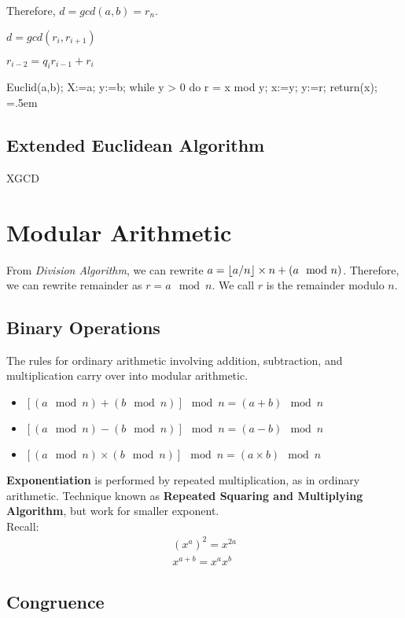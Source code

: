 \documentclass[a4paper]{article}
\DeclarePairedDelimiter\floor{\lfloor}{\rfloor}
\newenvironment{lcverbatim}
 {\SaveVerbatim{cverb}}
 {\endSaveVerbatim
  \flushleft\fboxrule=0pt\fboxsep=.5em
  \colorbox{cverbbg}{%
    \makebox[\dimexpr\linewidth-2\fboxsep][l]{\BUseVerbatim{cverb}}%
  }
  \endflushleft
}
\begin{document}
Therefore, $d = gcd(a, b) = r_n$.

$d = gcd(r_{i}, r_{i+1})$

$r_{i-2} = q_{i} r_{i-1} + r_{i}$

\begin{lcverbatim}
Euclid(a,b);
X:=a; y:=b;
while y > 0 do {
  r = x mod y;
  x:=y;
  y:=r; }
return(x);
\end{lcverbatim}

\subsection{Extended Euclidean Algorithm}

XGCD


\section{Modular Arithmetic}

From \textit{Division Algorithm}, we can rewrite $a = \floor{a/n} \times n + (a \mod n)$. Therefore, we can rewrite remainder as $r = a \mod n$. We call $r$ is the remainder modulo $n$.

\subsection{Binary Operations}

The rules for ordinary arithmetic involving addition, subtraction, and multiplication carry over into modular arithmetic.

\begin{itemize}
\item $[(a \mod n) + (b \mod n)] \mod n = (a + b) \mod n$
\item $[(a \mod n) - (b \mod n)] \mod n = (a - b) \mod n$
\item $[(a \mod n) \times (b \mod n)] \mod n = (a \times b) \mod n$
\end{itemize}

\textbf{Exponentiation} is performed by repeated multiplication, as in ordinary arithmetic. Technique known as \textbf{Repeated Squaring and Multiplying Algorithm}, but work for smaller exponent. 
\\
Recall:
\begin{align*}
(x^a)^2 = x^{2a} \\
x^{a+b} = x^{a}  x^{b}
\end{align*}


\subsection{Congruence}
\end{document}
